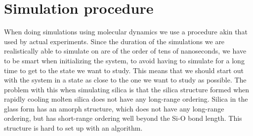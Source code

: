 \chapter{Simulation procedure}
%
When doing simulations using molecular dynamics we use a procedure akin that used by actual experiments. Since the duration of the simulations we are realistically able to simulate on are of the order of tens of nanoseconds, we have to be smart when initializing the system, to avoid having to simulate for a long time to get to the state we want to study. This means that we should start out with the system in a state as close to the one we want to study as possible. The problem with this when simulating silica is that the silica structure formed when rapidly cooling molten silica does not have any long-range ordering. Silica in the glass form has an amorph structure, which does not have any long-range ordering, but has short-range ordering well beyond the Si-O bond length. This structure is hard to set up with an algorithm.